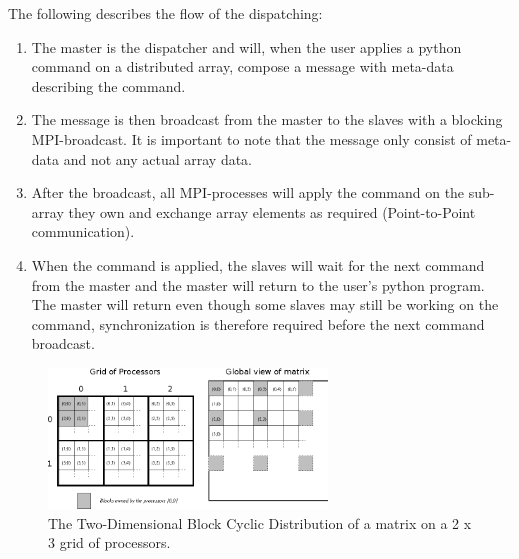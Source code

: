 \documentclass[10pt]{article}
\begin{document}
The following describes the flow of the dispatching:
\begin{enumerate}
\item The master is the dispatcher and will, when the user applies a python command on a distributed array, compose a message with meta-data describing the command. 
\item The message is then broadcast from the master to the slaves with a blocking MPI-broadcast. It is important to note that the message only consist of meta-data and not any actual array data.
\item After the broadcast, all MPI-processes will apply the command on the sub-array they own and exchange array elements as required (Point-to-Point communication).
\item When the command is applied, the slaves will wait for the next command from the master and the master will return to the user's python program. The master will return even though some slaves may still be working on the command, synchronization is therefore required before the next command broadcast.
\end{enumerate}


\begin{figure}
 \centering
 \includegraphics[width=280px]{gfx/datalayout}
 \caption{The Two-Dimensional Block Cyclic Distribution of a matrix on a 2 x 3 grid of processors.}
 \label{fig:datalayout}
\end{figure}
\end{document}
